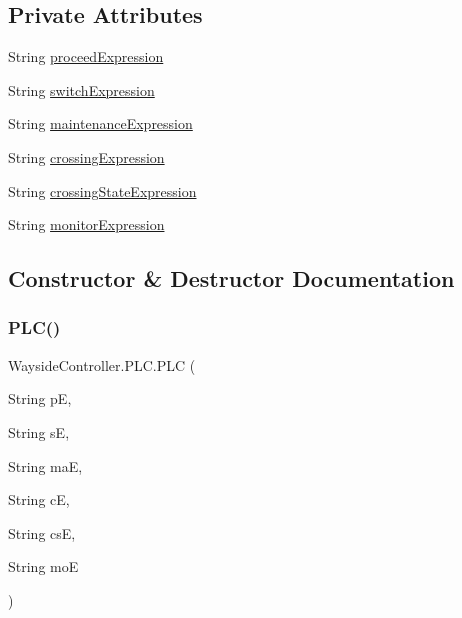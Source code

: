 \subsection*{Private Attributes}
\begin{DoxyCompactItemize}
\item 
String \hyperlink{classWaysideController_1_1PLC_affffe6e548e3e627c44fda340ff6b65b}{proceed\+Expression}
\item 
String \hyperlink{classWaysideController_1_1PLC_ab6616556bdf225a697db35a4d330024e}{switch\+Expression}
\item 
String \hyperlink{classWaysideController_1_1PLC_aaf3416f0f6eb620ef9dc9745a2a27617}{maintenance\+Expression}
\item 
String \hyperlink{classWaysideController_1_1PLC_acafd6381b97c21f60f1267e7b98f70f1}{crossing\+Expression}
\item 
String \hyperlink{classWaysideController_1_1PLC_a1c05e7c7479c250f83500a2fde0a03d4}{crossing\+State\+Expression}
\item 
String \hyperlink{classWaysideController_1_1PLC_a524d834de5024e021c8e21bbdb27af99}{monitor\+Expression}
\end{DoxyCompactItemize}


\subsection{Constructor \& Destructor Documentation}
\mbox{\label{classWaysideController_1_1PLC_af4c4636b44883be330c95dadb07ce0b9}} 
\subsubsection{\texorpdfstring{P\+L\+C()}{PLC()}}
{\footnotesize\ttfamily Wayside\+Controller.\+P\+L\+C.\+P\+LC (\begin{DoxyParamCaption}\item[{String}]{pE,  }\item[{String}]{sE,  }\item[{String}]{maE,  }\item[{String}]{cE,  }\item[{String}]{csE,  }\item[{String}]{moE }\end{DoxyParamCaption})}



